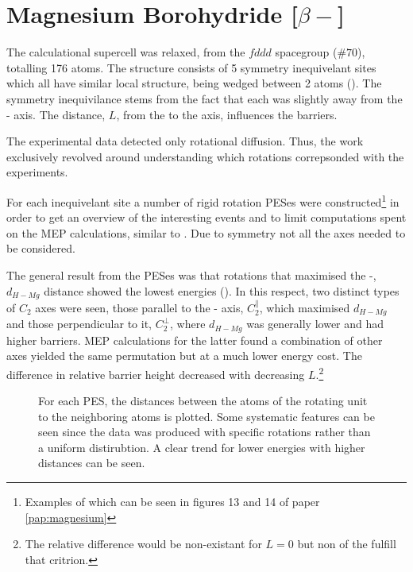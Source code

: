 \section{Magnesium Borohydride [$\beta-$]}
\label{sec:borohydrides-magnesium}

The calculational supercell was relaxed, from the $fddd$ spacegroup ($\#70$), totalling 176 atoms.
The structure consists of 5 symmetry inequivelant  sites which all have similar local structure, being wedged between 2  atoms ().
The symmetry inequivilance stems from the fact that each  was slightly away from the - axis.
The distance, $L$, from the  to the axis, influences the barriers.


The experimental data detected only rotational diffusion.
Thus, the work exclusively revolved around understanding which rotations correpsonded with the experiments.

For each inequivelant site a number of rigid rotation PESes were constructed\footnote{Examples of which can be seen in figures 13 and 14 of paper \ref{pap:magnesium}} in order to get an overview of the interesting events and to limit computations spent on the MEP calculations, similar to .
Due to symmetry not all the axes needed to be considered.

The general result from the PESes was that rotations that maximised the -, $d_{H-Mg}$ distance showed the lowest energies ().
In this respect, two distinct types of $C_2$ axes were seen, those parallel to the - axis, $C_2^\parallel$, which maximised $d_{H-Mg}$ and those perpendicular to it, $C_2^\perp$, where $d_{H-Mg}$ was generally lower and had higher barriers.
MEP calculations for the latter found a combination of other axes yielded the same permutation but at a much lower energy cost.
The difference in relative barrier height decreased with decreasing $L$.\footnote{The relative difference would be non-existant for $L=0$ but non of the  fulfill that critrion.}

\begin{figure}[h]
\begin{center}
    \parbox{0.85\linewidth}{
      \caption{For each PES, the distances between the  atoms of the rotating  unit to the neighboring  atoms is plotted.
Some systematic features can be seen since the data was produced with specific rotations rather than a uniform distirubtion.
A clear trend for lower energies with higher distances can be seen.
      }
      \label{fig:h-mg-distances}
    }
\end{center}
\end{figure}


